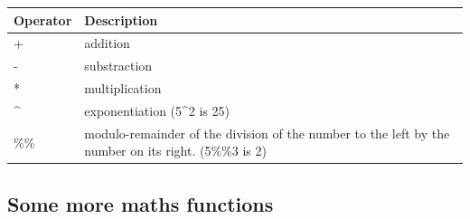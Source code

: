 \documentclass[
]{book}
\begin{document}
\begin{longtable}[]{@{}ll@{}}
\toprule
\begin{minipage}[b]{0.47\columnwidth}\raggedright
Operator\strut
\end{minipage} & \begin{minipage}[b]{0.47\columnwidth}\raggedright
Description\strut
\end{minipage}\tabularnewline
\midrule
\endhead
\begin{minipage}[t]{0.47\columnwidth}\raggedright
+\strut
\end{minipage} & \begin{minipage}[t]{0.47\columnwidth}\raggedright
addition\strut
\end{minipage}\tabularnewline
\begin{minipage}[t]{0.47\columnwidth}\raggedright
-\strut
\end{minipage} & \begin{minipage}[t]{0.47\columnwidth}\raggedright
substraction\strut
\end{minipage}\tabularnewline
\begin{minipage}[t]{0.47\columnwidth}\raggedright
*\strut
\end{minipage} & \begin{minipage}[t]{0.47\columnwidth}\raggedright
multiplication\strut
\end{minipage}\tabularnewline
\begin{minipage}[t]{0.47\columnwidth}\raggedright
\^{}\strut
\end{minipage} & \begin{minipage}[t]{0.47\columnwidth}\raggedright
exponentiation (5\^{}2 is 25)\strut
\end{minipage}\tabularnewline
\begin{minipage}[t]{0.47\columnwidth}\raggedright
\%\%\strut
\end{minipage} & \begin{minipage}[t]{0.47\columnwidth}\raggedright
modulo-remainder of the division of the number to the left by the number on its right. (5\%\%3 is 2)\strut
\end{minipage}\tabularnewline
\bottomrule
\end{longtable}

\hypertarget{some-more-maths-functions}{%
\subsection{Some more maths functions}\label{some-more-maths-functions}}
\end{document}
